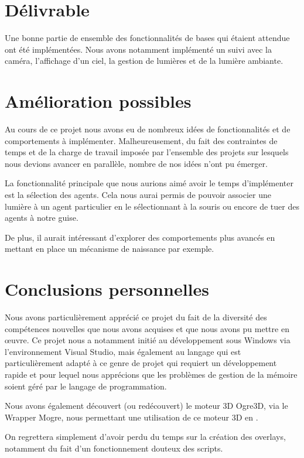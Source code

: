 \section{Délivrable}

Une bonne partie de ensemble des fonctionnalités de bases qui étaient attendue
ont été implémentées. Nous avons notamment implémenté un suivi avec la caméra,
l'affichage d'un ciel, la gestion de lumières et de la lumière ambiante.

\section{Amélioration possibles}

Au cours de ce projet nous avons eu de nombreux idées de fonctionnalités et de
comportements à implémenter. Malheureusement, du fait des contraintes de temps
et de la charge de travail imposée par l'ensemble des projets sur lesquels
nous devions avancer en parallèle, nombre de nos idées n'ont pu émerger.

La fonctionnalité principale que nous aurions aimé avoir le temps
d'implémenter est la sélection des agents. Cela nous aurai permis de pouvoir
associer une lumière à un agent particulier en le sélectionnant à la souris ou
encore de tuer des agents à notre guise.

De plus, il aurait intéressant d'explorer des comportements plus avancés en
mettant en place un mécanisme de naissance par exemple.

\section{Conclusions personnelles}

Nous avons particulièrement apprécié ce projet du fait de la diversité des
compétences nouvelles que nous avons acquises et que nous avons pu mettre en
œuvre. Ce projet nous a notamment initié au développement sous Windows via
l'environnement Visual Studio, mais également au langage \CS qui est
particulièrement adapté à ce genre de projet qui requiert un développement
rapide et pour lequel nous apprécions que les problèmes de gestion de la
mémoire soient géré par le langage de programmation.

Nous avons également découvert (ou redécouvert) le moteur 3D Ogre3D, via le
Wrapper Mogre, nous permettant une utilisation de ce moteur 3D en \CS.

On regrettera simplement d'avoir perdu du temps sur la création des overlays,
notamment du fait d'un fonctionnement douteux des scripts.
